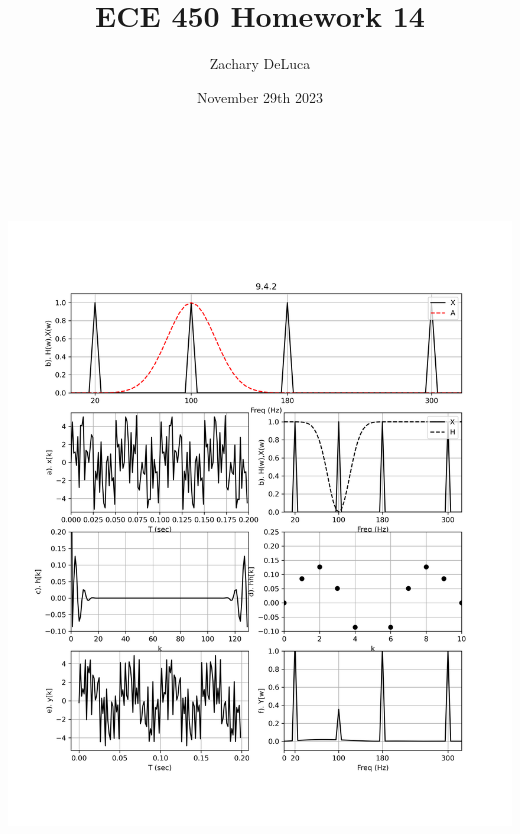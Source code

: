 \documentclass[12pt,a4paper]{article}
\title{ECE 450 Homework 14}
\author{Zachary DeLuca}
\date{November 29th 2023}
\begin{document}
	
	\maketitle
\hline
\begin{center}
	\includegraphics[height = 7.5in]{9.4.2.png} 
	\newpage

\end{center}
\end{document}
